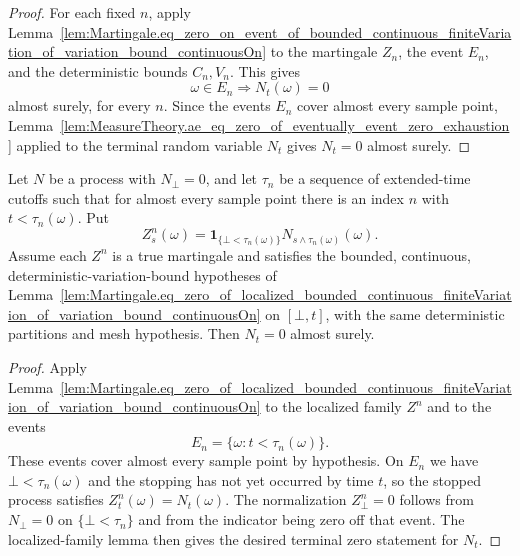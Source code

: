 \begin{proof}
For each fixed \(n\), apply
Lemma~\ref{lem:Martingale.eq_zero_on_event_of_bounded_continuous_finiteVariation_of_variation_bound_continuousOn}
to the martingale \(Z_n\), the event \(E_n\), and the deterministic bounds
\(C_n,V_n\).  This gives
\[
  \omega\in E_n \Longrightarrow N_t(\omega)=0
\]
almost surely, for every \(n\).  Since the events \(E_n\) cover almost every
sample point, Lemma~\ref{lem:MeasureTheory.ae_eq_zero_of_eventually_event_zero_exhaustion}
applied to the terminal random variable \(N_t\) gives \(N_t=0\) almost surely.
\end{proof}

\begin{lemma}\label{lem:Martingale.eq_zero_of_stoppedProcess_bounded_continuous_finiteVariation_of_variation_bound_continuousOn}
Let \(N\) be a process with \(N_\bot=0\), and let \(\tau_n\) be a sequence of
extended-time cutoffs such that for almost every sample point there is an
index \(n\) with \(t<\tau_n(\omega)\).  Put
\[
  Z^n_s(\omega)
  =
  \mathbf 1_{\{\bot<\tau_n(\omega)\}}
  N_{s\wedge \tau_n(\omega)}(\omega).
\]
Assume each \(Z^n\) is a true martingale and satisfies the bounded,
continuous, deterministic-variation-bound hypotheses of
Lemma~\ref{lem:Martingale.eq_zero_of_localized_bounded_continuous_finiteVariation_of_variation_bound_continuousOn}
on \([\bot,t]\), with the same deterministic partitions and mesh hypothesis.
Then \(N_t=0\) almost surely.
\end{lemma}

\begin{proof}
Apply
Lemma~\ref{lem:Martingale.eq_zero_of_localized_bounded_continuous_finiteVariation_of_variation_bound_continuousOn}
to the localized family \(Z^n\) and to the events
\[
  E_n=\{\omega : t<\tau_n(\omega)\}.
\]
These events cover almost every sample point by hypothesis.  On \(E_n\) we have
\(\bot<\tau_n(\omega)\) and the stopping has not yet occurred by time \(t\), so
the stopped process satisfies \(Z^n_t(\omega)=N_t(\omega)\).  The normalization
\(Z^n_\bot=0\) follows from \(N_\bot=0\) on \(\{\bot<\tau_n\}\) and from the
indicator being zero off that event.  The localized-family lemma then gives the
desired terminal zero statement for \(N_t\).
\end{proof}

